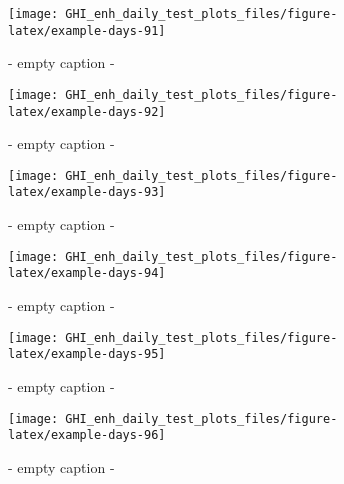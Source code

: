 \documentclass[
  10pt,
  a4paper,oneside]{article}
\begin{document}
\begin{figure}[H]

{\centering \texttt{[image: GHI\_enh\_daily\_test\_plots\_files/figure-latex/example-days-91]} 

}

\caption{ - empty caption - }\label{fig:example-days-91}
\end{figure}

\begin{figure}[H]

{\centering \texttt{[image: GHI\_enh\_daily\_test\_plots\_files/figure-latex/example-days-92]} 

}

\caption{ - empty caption - }\label{fig:example-days-92}
\end{figure}

\begin{figure}[H]

{\centering \texttt{[image: GHI\_enh\_daily\_test\_plots\_files/figure-latex/example-days-93]} 

}

\caption{ - empty caption - }\label{fig:example-days-93}
\end{figure}

\begin{figure}[H]

{\centering \texttt{[image: GHI\_enh\_daily\_test\_plots\_files/figure-latex/example-days-94]} 

}

\caption{ - empty caption - }\label{fig:example-days-94}
\end{figure}

\begin{figure}[H]

{\centering \texttt{[image: GHI\_enh\_daily\_test\_plots\_files/figure-latex/example-days-95]} 

}

\caption{ - empty caption - }\label{fig:example-days-95}
\end{figure}

\begin{figure}[H]

{\centering \texttt{[image: GHI\_enh\_daily\_test\_plots\_files/figure-latex/example-days-96]} 

}

\caption{ - empty caption - }\label{fig:example-days-96}
\end{figure}
\end{document}
